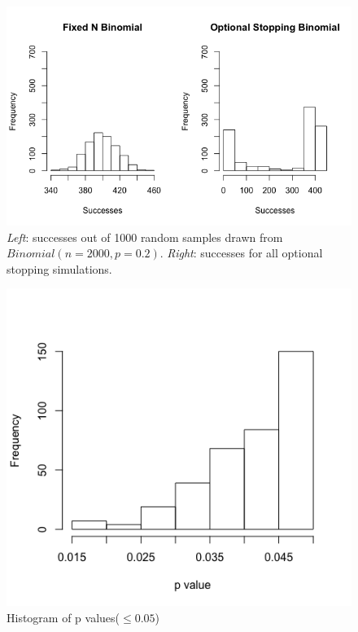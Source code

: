 \begin{figure}[h] 
\begin{center}
\includegraphics[scale=0.5]{fixedvsoptionalsuc.png}
	\caption{\emph{Left}: successes out of 1000 random samples drawn from $Binomial(n=2000,p=0.2)$. \emph{Right}: successes for all optional stopping simulations.}
	\label{fig:freqhistsuc}
\end{center}	
\end{figure}


\begin{figure}[h] 
\begin{center}
\includegraphics[scale=0.4]{freqstoppval.png}
	\caption{Histogram of p values($\leq 0.05$)}
	\label{fig:freqhistpval}
\end{center}	
\end{figure}

